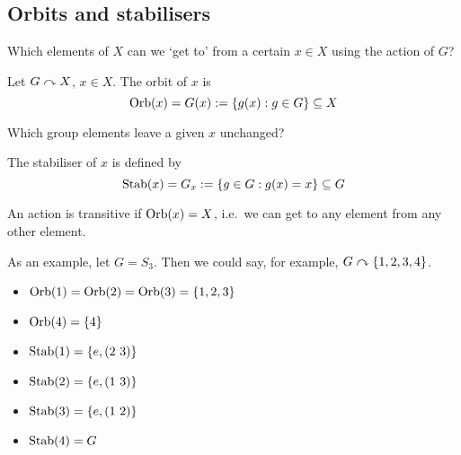 \subsection{Orbits and stabilisers}
Which elements of \(X\) can we `get to' from a certain \(x \in X\) using the action of \(G\)?
\begin{definition}
	Let \(G \curvearrowright X\), \(x \in X\).
	The orbit of \(x\) is
	\[
		\operatorname{Orb} (x) = G(x) := \{ g(x) : g \in G \} \subseteq X
	\]
\end{definition}
\noindent Which group elements leave a given \(x\) unchanged?
\begin{definition}
	The stabiliser of \(x\) is defined by
	\[
		\operatorname{Stab}(x) = G_x := \{ g \in G : g(x) = x \} \subseteq G
	\]
\end{definition}
\begin{definition}
	An action is transitive if \(\operatorname{Orb}(x) = X\), i.e.\ we can get to any element from any other element.
\end{definition}
As an example, let \(G = S_3\).
Then we could say, for example, \(G \curvearrowright \{ 1, 2, 3, 4 \}\).
\begin{itemize}
	\item \(\operatorname{Orb}(1) = \operatorname{Orb}(2) = \operatorname{Orb}(3) = \{ 1, 2, 3 \}\)
	\item \(\operatorname{Orb}(4) = \{ 4 \}\)
	\item \(\operatorname{Stab}(1) = \{ e, (2\ 3) \}\)
	\item \(\operatorname{Stab}(2) = \{ e, (1\ 3) \}\)
	\item \(\operatorname{Stab}(3) = \{ e, (1\ 2) \}\)
	\item \(\operatorname{Stab}(4) = G\)
\end{itemize}

